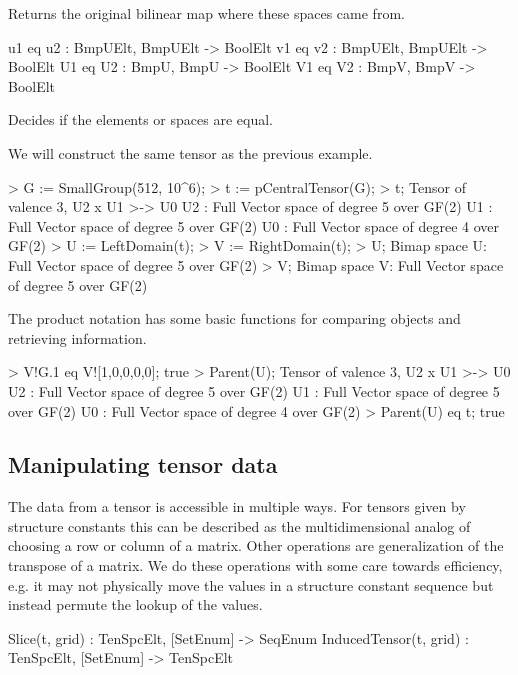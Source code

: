 Returns the original bilinear map where these spaces came from.

\begin{intrinsics}
u1 eq u2 : BmpUElt, BmpUElt -> BoolElt
v1 eq v2 : BmpUElt, BmpUElt -> BoolElt
U1 eq U2 : BmpU, BmpU -> BoolElt
V1 eq V2 : BmpV, BmpV -> BoolElt
\end{intrinsics}

Decides if the elements or spaces are equal.

\begin{example}[BimapProduct2]

We will construct the same tensor as the previous example.
\begin{code}
> G := SmallGroup(512, 10^6);
> t := pCentralTensor(G);
> t;
Tensor of valence 3, U2 x U1 >-> U0
U2 : Full Vector space of degree 5 over GF(2)
U1 : Full Vector space of degree 5 over GF(2)
U0 : Full Vector space of degree 4 over GF(2)
> U := LeftDomain(t);
> V := RightDomain(t);
> U;
Bimap space U: Full Vector space of degree 5 over GF(2)
> V;
Bimap space V: Full Vector space of degree 5 over GF(2)
\end{code}

The product notation has some basic functions for comparing objects and retrieving information.
\begin{code}
> V!G.1 eq V![1,0,0,0,0];
true
> Parent(U);
Tensor of valence 3, U2 x U1 >-> U0
U2 : Full Vector space of degree 5 over GF(2)
U1 : Full Vector space of degree 5 over GF(2)
U0 : Full Vector space of degree 4 over GF(2)
> Parent(U) eq t;
true
\end{code}
\end{example}


\subsection{Manipulating tensor data} 
The data from a tensor is accessible in multiple ways. 
For tensors given by structure constants this can be described as the multidimensional analog of choosing a row or column of a matrix.
Other operations are generalization of the transpose of a matrix.
We do these operations with some care towards efficiency, e.g.\! it may not physically move the values in a structure constant sequence but instead permute the lookup of the values.


\begin{intrinsics}
Slice(t, grid) : TenSpcElt, [SetEnum] -> SeqEnum
InducedTensor(t, grid) : TenSpcElt, [SetEnum] -> TenSpcElt
\end{intrinsics}

